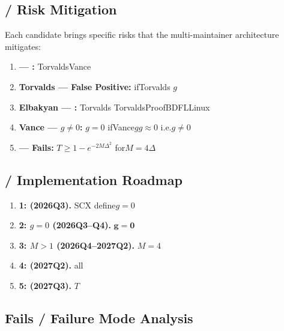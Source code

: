 \documentclass[12pt,a4paper]{article}
\theoremstyle{remark}
\newcommand{\rotationPeriod}{T}
\begin{document}
\subsection{ / Risk Mitigation}

Each candidate brings specific risks that the multi-maintainer architecture
mitigates:

\begin{enumerate}[leftmargin=*]
    \item \textbf{ — :} TorvaldsVance
          

    \item \textbf{Torvalds — False Positive:} ifTorvalds
          $g$
          

    \item \textbf{Elbakyan — :} Torvalds
          TorvaldsProofBDFLLinux
          

    \item \textbf{Vance — $g \neq 0$:} $g=0$
          ifVance$g$$g \approx 0$
          i.e.$g \neq 0$

    \item \textbf{ — Fails:} 
          $\rotationPeriod$$\geq 1 - e^{-2M\Delta^2}$
          for$M=4$$\Delta$
\end{enumerate}

\subsection{ / Implementation Roadmap}

\begin{enumerate}[leftmargin=*]
    \item \textbf{1:  (2026Q3).}
          SCX
          define$g=0$

    \item \textbf{2: $g=0$ (2026Q3–Q4).}
          $\mathbf{g} = \mathbf{0}$
          

    \item \textbf{3: $M>1$ (2026Q4–2027Q2).}
          $M=4$
          

    \item \textbf{4:  (2027Q2).}
          all
          

    \item \textbf{5:  (2027Q3).}
          $\rotationPeriod$
          
\end{enumerate}

\subsection{Fails / Failure Mode Analysis}
\end{document}
